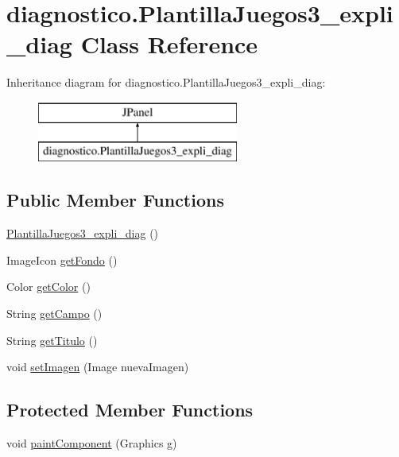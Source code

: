 \hypertarget{classdiagnostico_1_1_plantilla_juegos3__expli__diag}{}\section{diagnostico.\+Plantilla\+Juegos3\+\_\+expli\+\_\+diag Class Reference}
\label{classdiagnostico_1_1_plantilla_juegos3__expli__diag}
Inheritance diagram for diagnostico.\+Plantilla\+Juegos3\+\_\+expli\+\_\+diag\+:\begin{figure}[H]
\begin{center}
\leavevmode
\includegraphics[height=2.000000cm]{classdiagnostico_1_1_plantilla_juegos3__expli__diag}
\end{center}
\end{figure}
\subsection*{Public Member Functions}
\begin{DoxyCompactItemize}
\item 
\mbox{\hyperlink{classdiagnostico_1_1_plantilla_juegos3__expli__diag_a12aea2c01c8b395402c371f42713ab5a}{Plantilla\+Juegos3\+\_\+expli\+\_\+diag}} ()
\item 
Image\+Icon \mbox{\hyperlink{classdiagnostico_1_1_plantilla_juegos3__expli__diag_af78c15f3573119c6ab905bd4de543687}{get\+Fondo}} ()
\item 
Color \mbox{\hyperlink{classdiagnostico_1_1_plantilla_juegos3__expli__diag_a6de9f0d47480023673aca4680c9196a7}{get\+Color}} ()
\item 
String \mbox{\hyperlink{classdiagnostico_1_1_plantilla_juegos3__expli__diag_ab9f0b4f2bd4ce9d1703af67a1465b64a}{get\+Campo}} ()
\item 
String \mbox{\hyperlink{classdiagnostico_1_1_plantilla_juegos3__expli__diag_af05bbb2c79a98b1ab7786d34ab718d7f}{get\+Titulo}} ()
\item 
void \mbox{\hyperlink{classdiagnostico_1_1_plantilla_juegos3__expli__diag_a1d613bb5b504823f4d8cffbbb1ec51b5}{set\+Imagen}} (Image nueva\+Imagen)
\end{DoxyCompactItemize}
\subsection*{Protected Member Functions}
\begin{DoxyCompactItemize}
\item 
void \mbox{\hyperlink{classdiagnostico_1_1_plantilla_juegos3__expli__diag_a0fb3f55a74d04109b29485083d4ce091}{paint\+Component}} (Graphics g)
\end{DoxyCompactItemize}


